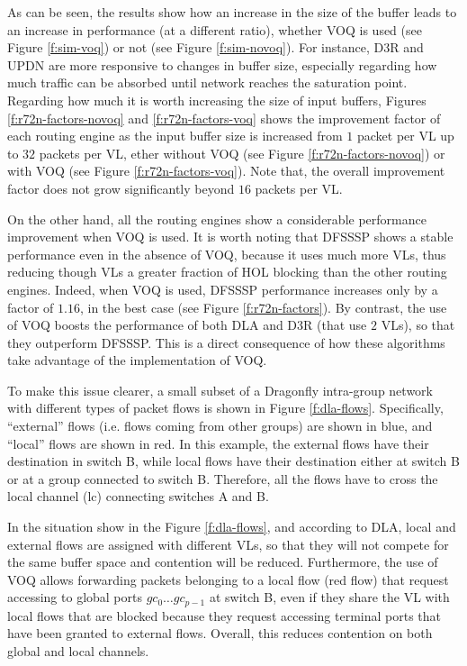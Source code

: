 \documentclass[review]{elsarticle}
\newcommand{\dfly}{Dragonfly}
\begin{document}
As can be seen, the results show how an increase in the size of the buffer leads to an increase in performance (at a different ratio),
whether VOQ is used (see Figure \ref{f:sim-voq}) or not (see Figure \ref{f:sim-novoq}).
For instance, D3R and UPDN are more responsive to changes in buffer size, especially regarding how much traffic can be absorbed until network reaches the saturation point.
Regarding how much it is worth increasing the size of input buffers, Figures \ref{f:r72n-factors-novoq} and \ref{f:r72n-factors-voq} shows
the improvement factor of each routing engine as the input buffer size is increased from $1$ packet per VL
up to $32$ packets per VL, ether without VOQ (see Figure \ref{f:r72n-factors-novoq})
or with VOQ (see Figure \ref{f:r72n-factors-voq}).
Note that, the overall improvement factor does not grow significantly beyond $16$ packets per VL.

On the other hand, all the routing engines show a considerable performance improvement when VOQ is used.
It is worth noting that DFSSSP shows a stable performance even in the absence of VOQ,
because it uses much more VLs, thus reducing though VLs a greater fraction of HOL blocking \cite{voq-sw_mgomez2003} than the other routing engines.
Indeed, when VOQ is used, DFSSSP performance increases only by a factor of $1.16$, in the best case (see Figure \ref{f:r72n-factors}).
By contrast, the use of VOQ boosts the performance of both DLA and D3R (that use $2$ VLs), so that they outperform DFSSSP.
This is a direct consequence of how these algorithms take advantage of the implementation of VOQ.

To make this issue clearer, a small subset of a \dfly{} intra-group network with different types of packet flows
is shown in Figure \ref{f:dla-flows}.
Specifically, ``external'' flows (i.e. flows coming from other groups) are shown in blue, and ``local'' flows are shown in red.
In this example, the external flows have their destination in switch B, while local flows have their destination either at switch B or at a group 
connected to switch B.
Therefore, all the flows have to cross the local channel (lc) connecting switches A and B.

In the situation show in the Figure \ref{f:dla-flows}, and according to DLA, local and external flows are assigned with 
different VLs, so that they will not compete for the same buffer space and contention will be reduced.
Furthermore, the use of VOQ allows forwarding packets belonging to a local flow (red flow) that request accessing to global ports $gc_0 \dots gc_{p-1}$
at switch B, even if they share the VL with local flows that are blocked because they request accessing terminal ports that have been granted to external flows.
Overall, this reduces contention on both global and local channels.
\end{document}
